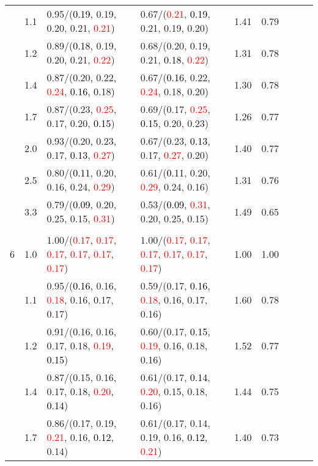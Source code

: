 \documentclass[10pt,a4paper]{report}
\begin{document}
\begin{table}[!htbp]
\begin{center}
{\begin{tabular}{ccllccccc}
			&1.1&0.95/(\textcolor{black}{0.19}, 0.19, 0.20, 0.21, \textcolor{red}{0.21})&0.67/(\textcolor{red}{0.21}, \textcolor{black}{0.19}, 0.21, 0.19, 0.20)&1.41&0.79\\
			&1.2&0.89/(\textcolor{black}{0.18}, 0.19, 0.20, 0.21, \textcolor{red}{0.22})&0.68/(0.20, 0.19, 0.21, \textcolor{black}{0.18}, \textcolor{red}{0.22})&1.31&0.78\\
			&1.4&0.87/(0.20, 0.22, \textcolor{red}{0.24}, \textcolor{black}{0.16}, 0.18)&0.67/(\textcolor{black}{0.16}, 0.22, \textcolor{red}{0.24}, 0.18, 0.20)&1.30&0.78\\
			&1.7&0.87/(0.23, \textcolor{red}{0.25}, 0.17, 0.20, \textcolor{black}{0.15})&0.69/(0.17, \textcolor{red}{0.25}, \textcolor{black}{0.15}, 0.20, 0.23)&1.26&0.77\\
			&2.0&0.93/(0.20, 0.23, 0.17, \textcolor{black}{0.13}, \textcolor{red}{0.27})&0.67/(0.23, \textcolor{black}{0.13}, 0.17, \textcolor{red}{0.27}, 0.20)&1.40&0.77\\
			&2.5&0.80/(\textcolor{black}{0.11}, 0.20, 0.16, 0.24, \textcolor{red}{0.29})&0.61/(\textcolor{black}{0.11}, 0.20, \textcolor{red}{0.29}, 0.24, 0.16)&1.31&0.76\\
			&3.3&0.79/(\textcolor{black}{0.09}, 0.20, 0.25, 0.15, \textcolor{red}{0.31})&0.53/(\textcolor{black}{0.09}, \textcolor{red}{0.31}, 0.20, 0.25, 0.15)&1.49&0.65\\
			&&&&\\
			6			&1.0&1.00/(\textcolor{red}{0.17}, \textcolor{red}{0.17}, \textcolor{red}{0.17}, \textcolor{red}{0.17}, \textcolor{red}{0.17}, \textcolor{red}{0.17})&1.00/(\textcolor{red}{0.17}, \textcolor{red}{0.17}, \textcolor{red}{0.17}, \textcolor{red}{0.17}, \textcolor{red}{0.17}, \textcolor{red}{0.17})&1.00&1.00\\
			&1.1&0.95/(\textcolor{black}{0.16}, 0.16, \textcolor{red}{0.18}, 0.16, 0.17, 0.17)&0.59/(0.17, \textcolor{black}{0.16}, \textcolor{red}{0.18}, 0.16, 0.17, 0.16)&1.60&0.78\\
			&1.2&0.91/(0.16, 0.16, 0.17, 0.18, \textcolor{red}{0.19}, \textcolor{black}{0.15})&0.60/(0.17, \textcolor{black}{0.15}, \textcolor{red}{0.19}, 0.16, 0.18, 0.16)&1.52&0.77\\
			&1.4&0.87/(0.15, 0.16, 0.17, 0.18, \textcolor{red}{0.20}, \textcolor{black}{0.14})&0.61/(0.17, \textcolor{black}{0.14}, \textcolor{red}{0.20}, 0.15, 0.18, 0.16)&1.44&0.75\\
			&1.7&0.86/(0.17, 0.19, \textcolor{red}{0.21}, 0.16, \textcolor{black}{0.12}, 0.14)&0.61/(0.17, 0.14, 0.19, 0.16, \textcolor{black}{0.12}, \textcolor{red}{0.21})&1.40&0.73\\

\end{tabular}}
\end{center}
\end{table}
\end{document}

